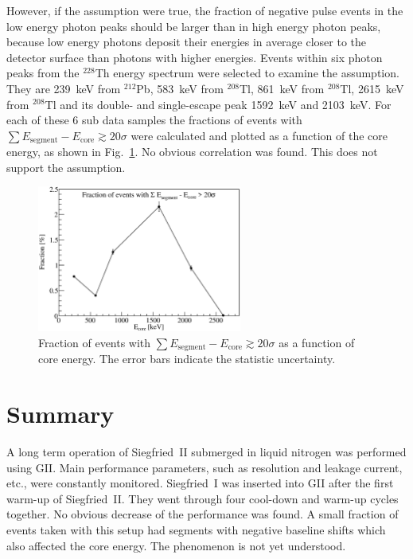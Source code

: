 However, if the assumption were true, the fraction of negative pulse events in the low energy photon peaks should be larger than in high energy photon peaks, because low energy photons deposit their energies in average closer to the detector surface than photons with higher energies. Events within six photon peaks from the $^{228}$Th energy spectrum were selected to examine the assumption. They are 239~keV from $^{212}$Pb, 583~keV from $^{208}$Tl, 861~keV from $^{208}$Tl, 2615~keV from $^{208}$Tl and its double- and single-escape peak 1592~keV and 2103~keV. For each of these 6 sub data samples the fractions of events with $\sum E_{\text{segment}} - E_{\text{core}} \gtrsim 20\sigma$ were calculated and plotted as a function of the core energy, as shown in Fig.~\ref{f:fnp_e}. No obvious correlation was found. This does not support the assumption. 

\begin{figure}[tphb]
\centering
\includegraphics[width=0.6\textwidth]{fnp_e}
\caption{Fraction of events with $\sum E_{\text{segment}} - E_{\text{core}} \gtrsim 20\sigma$ as a function of core energy. The error bars indicate the statistic uncertainty.}
\label{f:fnp_e}
\end{figure}

\section{Summary}
\label{sec:ii:sum}
A long term operation of Siegfried~II submerged in liquid nitrogen was performed using GII. Main performance parameters, such as resolution and leakage current, etc., were constantly monitored. Siegfried~I was inserted into GII after the first warm-up of Siegfried~II. They went through four cool-down and warm-up cycles together. No obvious decrease of the performance was found. A small fraction of events taken with this setup had segments with negative baseline shifts which also affected the core energy. The phenomenon is not yet understood.


